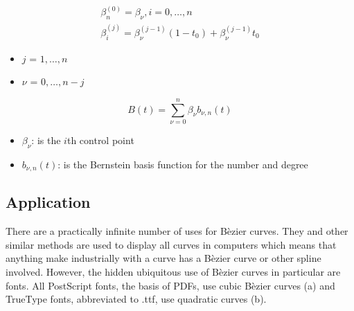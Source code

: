 \documentclass[12pt, letterpaper]{article}
\begin{document}
\begin{singlespace}
  \begin{gather}
    \label{eq:DCRec}
    \beta_{n}^{(0)} = \beta_\nu, i = 0,\ldots, n \\
    \beta_{i}^{(j)} = \beta_{\nu}^{(j-1)} (1 - t_0) + \beta_{\nu}^{(j-1)} t_0
  \end{gather}
  \begin{small}
    \begin{itemize}[label=]
      \item $j$ = $1,\ldots,n$
      \item $\nu$ = $0,\ldots,n-j$
    \end{itemize}
  \end{small}
  \begin{equation}
    \label{eq:DCExplicit}
    B(t) = \sum_{\nu=0}^{n} \beta_\nu b_{\nu,n}(t)
  \end{equation}
  \begin{small}
    \begin{itemize}[label=]
      \item $\beta_\nu$: is the $i$th control point
      \item $b_{\nu,n}(t)$: is the Bernstein basis function for the number and degree
    \end{itemize}
  \end{small}
\end{singlespace}

\subsection{Application}
There are a practically infinite number of uses for B\`ezier curves. They and other similar methods are used
to display all curves in computers which means that anything make industrially with a curve has a B\`ezier
curve or other spline involved. However, the hidden ubiquitous use of B\`ezier curves in particular are
fonts. All PostScript fonts, the basis of PDFs, use cubic B\`ezier curves (a) and TrueType fonts,
abbreviated to .ttf, use quadratic curves (b).
\end{document}
